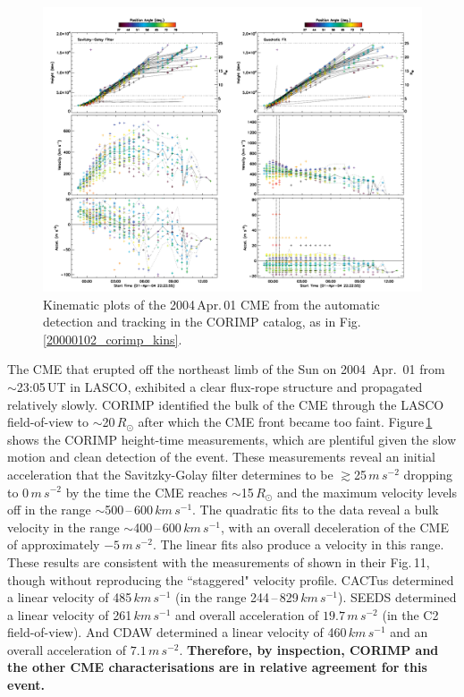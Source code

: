 \documentclass[referee,a4paper,12pt,traditabstract]{swsc}
\begin{document}
\begin{linenumbers}
\begin{figure}[t]
\centerline{\includegraphics[width=\linewidth]{images/20040401_corimp_kins.pdf}}
\caption{Kinematic plots of the 2004\,Apr.\,01 CME from the automatic detection and tracking in the CORIMP catalog, as in Fig.\,\ref{20000102_corimp_kins}.}
\label{20040401_corimp_kins}
\end{figure}

The CME that erupted off the northeast limb of the Sun on 2004~Apr.~01 from $\sim$23:05\,UT in LASCO, exhibited a clear flux-rope structure and propagated relatively slowly. CORIMP identified the bulk of the CME through the LASCO field-of-view to $\sim$20\,$R_\odot$ after which the CME front became too faint. Figure\,\ref{20040401_corimp_kins} shows the CORIMP height-time measurements, which are plentiful given the slow motion and clean detection of the event. These measurements reveal an initial acceleration that the Savitzky-Golay filter determines to be $\gtrsim$25\,$m\,s^{-2}$ dropping to 0\,$m\,s^{-2}$ by the time the CME reaches $\sim$15\,$R_\odot$ and the maximum velocity levels off in the range $\sim$500\,--\,600\,$km\,s^{-1}$. The quadratic fits to the data reveal a bulk velocity in the range $\sim$400\,--\,600\,$km\,s^{-1}$, with an overall deceleration of the CME of approximately $-5\,m\,s^{-2}$. The linear fits also produce a velocity in this range. These results are consistent with the measurements of \cite{2009A&A...495..325B} shown in their Fig.\,11, though without reproducing the ``staggered" velocity profile. CACTus determined a linear velocity of 485$\,km\,s^{-1}$ (in the range 244\,--\,829\,$km\,s^{-1}$). SEEDS determined a linear velocity of 261\,$km\,s^{-1}$ and overall acceleration of $19.7\,m\,s^{-2}$ (in the C2 field-of-view). And CDAW determined a linear velocity of 460$\,km\,s^{-1}$ and an overall acceleration of $7.1\,m\,s^{-2}$. {\bf Therefore, by inspection, CORIMP and the other CME characterisations are in relative agreement for this event.}



\end{linenumbers}
\end{document}
